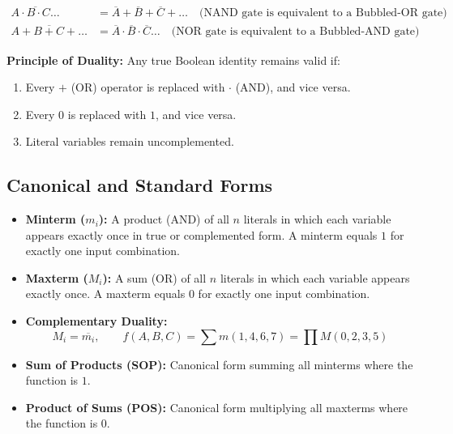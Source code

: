 \documentclass[12pt,a4paper]{article}
\begin{document}
\begin{tcolorbox}[formulabox, title={\textbf{De Morgan's Theorems}}]
\begin{align}
  \overline{A \cdot B \cdot C \dots} &= \overline{A} + \overline{B} + \overline{C} + \dots \quad \text{(NAND gate is equivalent to a Bubbled-OR gate)} \\
  \overline{A + B + C + \dots} &= \overline{A} \cdot \overline{B} \cdot \overline{C} \dots \quad \text{(NOR gate is equivalent to a Bubbled-AND gate)}
\end{align}
\end{tcolorbox}

\textbf{Principle of Duality:} Any true Boolean identity remains valid if:
\begin{enumerate}[label=\alph*., leftmargin=*]
  \item Every $+$ (OR) operator is replaced with $\cdot$ (AND), and vice versa.
  \item Every $0$ is replaced with $1$, and vice versa.
  \item Literal variables remain uncomplemented.
\end{enumerate}

\subsection{Canonical and Standard Forms}
\begin{itemize}[leftmargin=*, itemsep=3pt]
  \item \textbf{Minterm ($m_i$):} A product (AND) of all $n$ literals in which each variable appears exactly once in true or complemented form. A minterm equals $1$ for exactly one input combination.
  \item \textbf{Maxterm ($M_i$):} A sum (OR) of all $n$ literals in which each variable appears exactly once. A maxterm equals $0$ for exactly one input combination.
  \item \textbf{Complementary Duality:}
  \begin{equation}
    M_i = \overline{m_i}, \qquad f(A, B, C) = \sum m(1, 4, 6, 7) = \prod M(0, 2, 3, 5)
  \end{equation}
  \item \textbf{Sum of Products (SOP):} Canonical form summing all minterms where the function is $1$.
  \item \textbf{Product of Sums (POS):} Canonical form multiplying all maxterms where the function is $0$.
\end{itemize}
\end{document}
